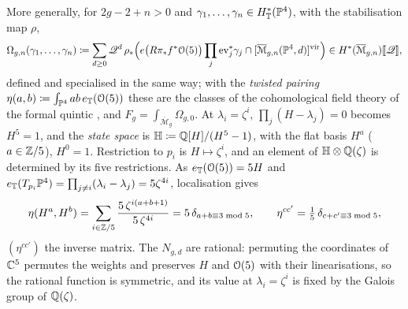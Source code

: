 \begin{defn}
More generally, for $2g-2+n>0$ and $\gamma_1,\dots,\gamma_n\in H^*_{\mathbb{T}}(\mathbb{P}^4)$, with the stabilisation map $\rho$,
\[
\Omega_{g,n}(\gamma_1,\dots,\gamma_n)\coloneqq\sum_{d\geq0}\mathscr{Q}^d\,\rho_*\Bigl(e\bigl(R\pi_*f^*\mathcal{O}(5)\bigr)\prod_{j}\mathrm{ev}_j^*\gamma_j\cap[\overline{\mathcal M}_{g,n}(\mathbb{P}^4,d)]^{\mathrm{vir}}\Bigr)\in H^*(\overline{\mathcal M}_{g,n})[\![ \mathscr{Q} ]\!],
\]
defined and specialised in the same way; with the \emph{twisted pairing} $\eta(a,b)\coloneqq\int_{\mathbb{P}^4}ab\,e_{\mathbb{T}}(\mathcal{O}(5))$ these are the classes of the cohomological field theory of the formal quintic \cite[Section~4.1]{GJR18}, and $F_g=\int_{\overline{\mathcal M}_g}\Omega_{g,0}$. At $\lambda_i=\zeta^i$, $\prod_j(H-\lambda_j)=0$ becomes $H^5=1$, and the \emph{state space} is $\mathbb{H}\coloneqq\mathbb{Q}[H]/(H^5-1)$, with the flat basis $H^a$ ($a\in\mathbb{Z}/5$), $H^0=1$. Restriction to $p_i$ is $H\mapsto\zeta^i$, and an element of $\mathbb{H}\otimes\mathbb{Q}(\zeta)$ is determined by its five restrictions. As $e_{\mathbb{T}}(\mathcal{O}(5))=5H$ and $e_{\mathbb{T}}(T_{p_i}\mathbb{P}^4)=\prod_{j\neq i}(\lambda_i-\lambda_j)=5\zeta^{4i}$, localisation gives
\[
\eta(H^a,H^b)=\sum_{i\in\mathbb{Z}/5}\frac{5\,\zeta^{i(a+b+1)}}{5\,\zeta^{4i}}=5\,\delta_{a+b\equiv3\bmod5},\qquad\eta^{cc'}=\tfrac15\,\delta_{c+c'\equiv3\bmod5},
\]
$(\eta^{cc'})$ the inverse matrix. The $N_{g,d}$ are rational: permuting the coordinates of $\mathbb{C}^5$ permutes the weights and preserves $H$ and $\mathcal{O}(5)$ with their linearisations, so the rational function is symmetric, and its value at $\lambda_i=\zeta^i$ is fixed by the Galois group of $\mathbb{Q}(\zeta)$.
\end{defn}

